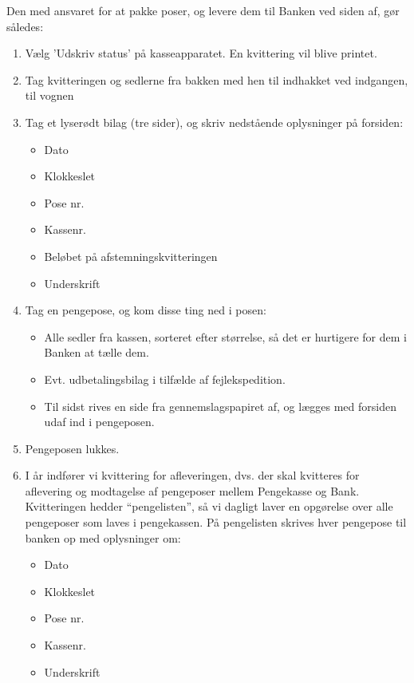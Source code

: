 Den med ansvaret for at pakke poser, og levere dem til Banken ved siden af, gør således:
\begin{enumerate}
  \item Vælg 'Udskriv status' på kasseapparatet. En kvittering vil blive printet.
  \item Tag kvitteringen og sedlerne fra bakken med hen til indhakket ved indgangen, til vognen
  \item Tag et lyserødt bilag (tre sider), og skriv nedstående oplysninger på forsiden:
  \begin{itemize}
    \item Dato
    \item Klokkeslet
    \item Pose nr.
    \item Kassenr.
    \item Beløbet på afstemningskvitteringen
    \item Underskrift
  \end{itemize}
  \item Tag en pengepose, og kom disse ting ned i posen:
  \begin{itemize}
    \item Alle sedler fra kassen, sorteret efter størrelse, så det er hurtigere for dem i Banken at 
    tælle dem. 
    \item Evt. udbetalingsbilag i tilfælde af fejlekspedition.
    \item Til sidst rives en side fra gennemslagspapiret af, og lægges med forsiden udaf ind i pengeposen.
  \end{itemize}
  \item Pengeposen lukkes.
  \item I år indfører vi kvittering for afleveringen, dvs. der skal kvitteres for aflevering og modtagelse 
  af pengeposer mellem Pengekasse og Bank.
  Kvitteringen hedder ``pengelisten'', så vi dagligt laver en opgørelse over alle pengeposer som laves i pengekassen. 
  På pengelisten skrives hver pengepose til banken op med oplysninger om: 
  \begin{itemize}
    \item Dato
    \item Klokkeslet
    \item Pose nr.
    \item Kassenr.
    \item Underskrift
  \end{itemize}
\end{enumerate}

